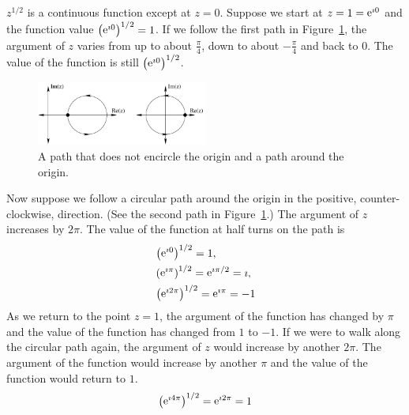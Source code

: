 \begin{Example}
  $z^{1/2}$ is a continuous function except at
  $z = 0$.  Suppose we start at $z = 1 = \mathop{\mathrm{e}}\nolimits^{\imath 0}$ and the function value
  $\left( \mathop{\mathrm{e}}\nolimits^{\imath 0} \right)^{1/2} = 1$.  If we follow the first path in 
  Figure~\ref{unchange_circle_01},
  the argument of $z$
  varies from up to about $\frac{\pi}{4}$, down to about $-\frac{\pi}{4}$
  and back to $0$.  The value of the function is still 
  $\left( \mathop{\mathrm{e}}\nolimits^{\imath 0} \right)^{1/2}$.

  \begin{figure}[htbp!]
    \begin{center}
      \includegraphics[width=0.5\textwidth]{fcv/function/unchange_change}
    \end{center}
    \caption{A path that does not encircle the origin and a path around 
      the origin.}
    \label{unchange_circle_01}
  \end{figure}

  Now suppose we follow a circular path around the origin in the positive,
  counter-clockwise, direction.  (See the second path in 
  Figure~\ref{unchange_circle_01}.)
  The argument of $z$ increases by $2 \pi$.  The value of the function at
  half turns on the path is
  \begin{align*}
    &\left( \mathop{\mathrm{e}}\nolimits^{\imath 0} \right)^{1/2} = 1, 
    \\
    &\left( \mathop{\mathrm{e}}\nolimits^{\imath \pi} \right)^{1/2} = \mathop{\mathrm{e}}\nolimits^{\imath \pi / 2} = \imath, 
    \\
    &\left( \mathop{\mathrm{e}}\nolimits^{\imath 2 \pi} \right)^{1/2} = \mathop{\mathrm{e}}\nolimits^{\imath \pi} = -1
  \end{align*}
  As we return to the point $z = 1$, the argument of the function has changed
  by $\pi$ and the value of the function has changed from $1$ to $-1$.
  If we were to walk along the circular path again, the argument of $z$
  would increase by another $2 \pi$.  The argument of the function would
  increase by another $\pi$ and the value of the function would return to $1$.
  \[
  \left( \mathop{\mathrm{e}}\nolimits^{\imath 4 \pi} \right)^{1/2} = \mathop{\mathrm{e}}\nolimits^{\imath 2 \pi} = 1
  \]




\end{Example}
